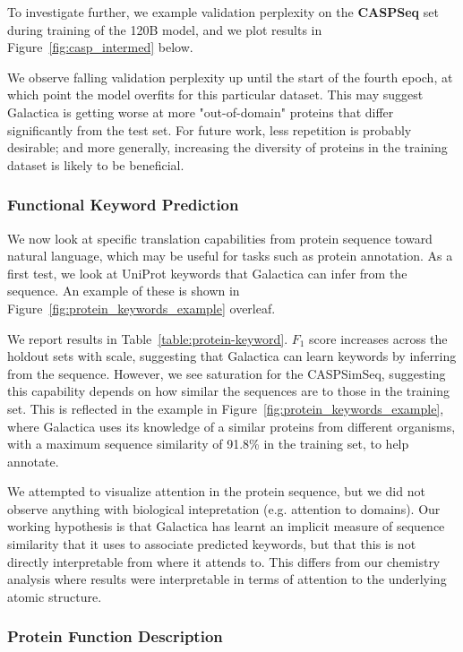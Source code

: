 {To investigate further, we example validation perplexity on the \textbf{CASPSeq} set during training of the 120B model, and we plot results in Figure~\ref{fig:casp_intermed} below.

We observe falling validation perplexity up until the start of the fourth epoch, at which point the model overfits for this particular dataset. This may suggest Galactica is getting worse at more "out-of-domain" proteins that differ significantly from the test set. For future work, less repetition is probably desirable; and more generally, increasing the diversity of proteins in the training dataset is likely to be beneficial.

\subsubsection{Functional Keyword Prediction}

We now look at specific translation capabilities from protein sequence toward natural language, which may be useful for tasks such as protein annotation. As a first test, we look at UniProt keywords that Galactica can infer from the sequence. An example of these is shown in Figure~\ref{fig:protein_keywords_example} overleaf.

We report results in Table~\ref{table:protein-keyword}. $F_{1}$ score increases across the holdout sets with scale, suggesting that Galactica can learn keywords by inferring from the sequence. However, we see saturation for the CASPSimSeq, suggesting this capability depends on how similar the sequences are to those in the training set. This is reflected in the example in Figure~\ref{fig:protein_keywords_example}, where Galactica uses its knowledge of a similar proteins from different organisms, with a maximum sequence similarity of 91.8\% in the training set, to help annotate.

We attempted to visualize attention in the protein sequence, but we did not observe anything with biological intepretation (e.g. attention to domains). Our working hypothesis is that Galactica has learnt an implicit measure of sequence similarity that it uses to associate predicted keywords, but that this is not directly interpretable from where it attends to. This differs from our chemistry analysis where results were interpretable in terms of attention to the underlying atomic structure.

\subsubsection{Protein Function Description}

}
